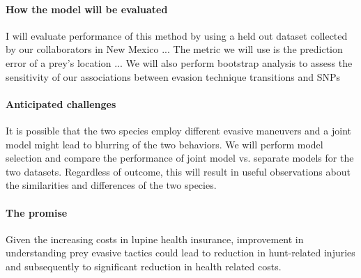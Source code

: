 \documentclass{article}
\begin{document}
\paragraph{How the model will be evaluated}
I will evaluate performance of this method by using a held out dataset collected by our collaborators in New Mexico ...
The metric we will use is the prediction error of a prey's location ... We will also perform bootstrap analysis to assess the sensitivity of our associations between evasion technique transitions and SNPs

\paragraph{Anticipated challenges}
It is possible that the two species employ different evasive maneuvers and a joint model might lead to blurring of the two behaviors.
We will perform model selection and compare the performance of joint model vs. separate models for the two datasets. Regardless of outcome, this will result in
 useful observations about the similarities and differences of the two species.

\paragraph{The promise}
Given the increasing costs in lupine health insurance, improvement in understanding prey evasive tactics could lead to reduction in hunt-related injuries and subsequently to significant reduction in health related costs.



\end{document}
